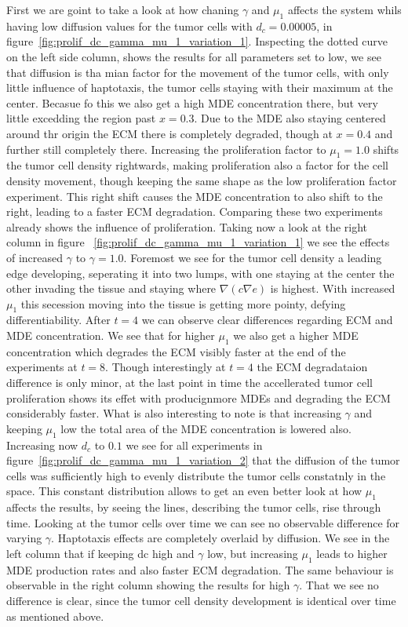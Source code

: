 First we are goint to take a look at how chaning $\gamma$ and $\mu_1$ affects the system whils having low diffusion values for the tumor cells with $d_c=0.00005$, in figure~\ref{fig:prolif_dc_gamma_mu_1_variation_1}. Inspecting the dotted curve on the left side column, shows the results for all parameters set to low, we see that diffusion is tha mian factor for the movement of the tumor cells, with only little influence of haptotaxis, the tumor cells staying with their maximum at the center. Becasue fo this we also get a high MDE concentration there, but very little excedding the region past $x=0.3$. Due to the MDE also staying centered around thr origin the ECM there is completely degraded, though at $x=0.4$ and further still completely there. Increasing the proliferation factor to $\mu_1=1.0$ shifts the tumor cell density rightwards, making proliferation also a factor for the cell density movement, though keeping the same shape as the low proliferation factor experiment. This right shift causes the MDE concentration to also shift to the right, leading to a faster ECM degradation. Comparing these two experiments already shows the influence of proliferation.\newline
Taking now a look at the right column in figure ~\ref{fig:prolif_dc_gamma_mu_1_variation_1} we see the effects of increased $\gamma$ to $\gamma=1.0$. Foremost we see for the tumor cell density a leading edge developing, seperating it into two lumps, with one staying at the center the other invading the tissue and staying where $\nabla (c \nabla e)$ is highest. With increased $\mu_1$ this secession moving into the tissue is getting more pointy, defying differentiability. After $t=4$ we can observe clear differences regarding ECM and MDE concentration. We see that for higher $\mu_1$ we also get a higher MDE concentration which degrades the ECM visibly faster at the end of the experiments at $t=8$. Though interestingly at $t=4$ the ECM degradataion difference is only minor, at the last point in time the accellerated tumor cell proliferation shows its effet with producignmore MDEs and degrading the ECM considerably faster. What is also interesting to note is that increasing $\gamma$ and keeping $\mu_1$ low the total area of the MDE concentration is lowered also.
Increasing now $d_c$ to $0.1$ we see for all experiments in figure~\ref{fig:prolif_dc_gamma_mu_1_variation_2} that the diffusion of the tumor cells was sufficiently high to evenly distribute the tumor cells constatnly in the space. This constant distribution allows to get an even better look at how $\mu_1$ affects the results, by seeing the lines, describing the tumor cells, rise through time. Looking at the tumor cells over time we can see no observable difference for varying $\gamma$. Haptotaxis effects are completely overlaid by diffusion. We see in the left column that if keeping dc high and $\gamma$ low, but increasing $\mu_1$ leads to higher MDE production rates and also faster ECM degradation. The same behaviour is observable in the right column showing the results for high $\gamma$. That we see no difference is clear, since the tumor cell density development is identical over time as mentioned above. 



